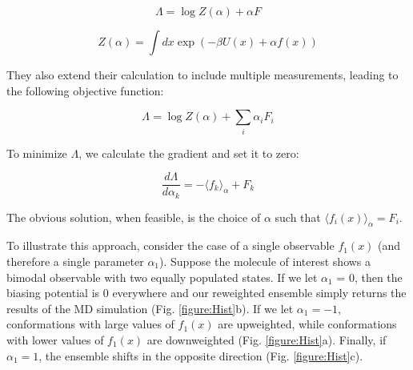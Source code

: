 \documentclass[12pt]{article}
\begin{document}
$$\Lambda = \log Z(\alpha) + \alpha F$$

$$Z(\alpha) = \int dx \exp(-\beta U(x) + \alpha f(x))$$

They also extend their calculation to include multiple measurements, leading to the following objective function:

$$\Lambda = \log Z(\alpha) + \sum_i \alpha_i F_i$$

To minimize $\Lambda$, we calculate the gradient and set it to zero:

$$\frac{d\Lambda}{d\alpha_k} = -\langle f_k \rangle_\alpha + F_k$$

The obvious solution, when feasible, is the choice of $\alpha$ such that $\langle f_i(x) \rangle_\alpha = F_i$.  

To illustrate this approach, consider the case of a single observable $f_1(x)$ (and therefore a single parameter $\alpha_1$).  Suppose the molecule of interest shows a bimodal observable with two equally populated states.  If we let $\alpha_1$ = 0, then the biasing potential is $0$ everywhere and our reweighted ensemble simply returns the results of the MD simulation (Fig. \ref{figure:Hist}b).  If we let $\alpha_1 = -1$, conformations with large values of $f_1(x)$ are upweighted, while conformations with lower values of $f_1(x)$ are downweighted (Fig. \ref{figure:Hist}a).  Finally, if $\alpha_1 = 1$, the ensemble shifts in the opposite direction (Fig. \ref{figure:Hist}c).  
\end{document}
